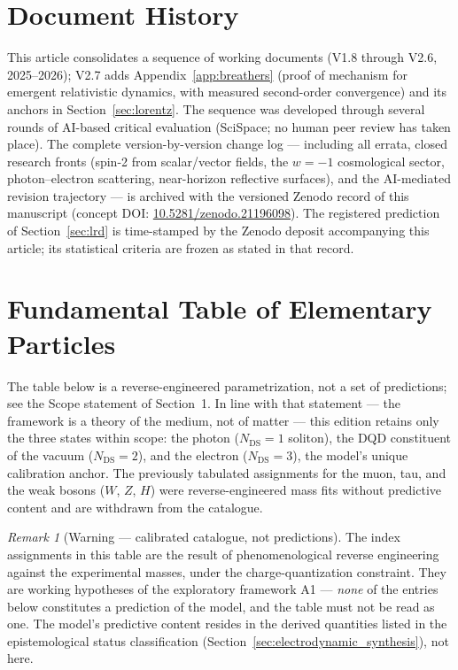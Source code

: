 \documentclass[11pt,a4paper]{article}
\theoremstyle{plain}
\theoremstyle{remark}
\newtheorem*{remarkstar}{Remark}
\newcommand{\Ncd}{\ensuremath{N_{\mathrm{DS}}}}
\begin{document}
\section{Document History}
This article consolidates a sequence of working documents (V1.8 through V2.6, 2025--2026); V2.7 adds Appendix~\ref{app:breathers} (proof of mechanism for emergent relativistic dynamics, with measured second-order convergence) and its anchors in Section~\ref{sec:lorentz}. The sequence was developed through several rounds of AI-based critical evaluation (SciSpace; no human peer review has taken place). The complete version-by-version change log --- including all errata, closed research fronts (spin-2 from scalar/vector fields, the $w=-1$ cosmological sector, photon--electron scattering, near-horizon reflective surfaces), and the AI-mediated revision trajectory --- is archived with the versioned Zenodo record of this manuscript (concept DOI: \href{https://doi.org/10.5281/zenodo.21196098}{10.5281/zenodo.21196098}). The registered prediction of Section~\ref{sec:lrd} is time-stamped by the Zenodo deposit accompanying this article; its statistical criteria are frozen as stated in that record.

\section{Fundamental Table of Elementary Particles}
The table below is a reverse-engineered parametrization, not a set of predictions; see the Scope statement of Section~1. In line with that statement --- the framework is a theory of the medium, not of matter --- this edition retains only the three states within scope: the photon ($\Ncd=1$ soliton), the DQD constituent of the vacuum ($\Ncd=2$), and the electron ($\Ncd=3$), the model's unique calibration anchor. The previously tabulated assignments for the muon, tau, and the weak bosons ($W$, $Z$, $H$) were reverse-engineered mass fits without predictive content and are withdrawn from the catalogue.

\begin{remarkstar}[Warning --- calibrated catalogue, not predictions]
The index assignments in this table are the result of phenomenological reverse engineering against the experimental masses, under the charge-quantization constraint. They are working hypotheses of the exploratory framework A1 --- \emph{none} of the entries below constitutes a prediction of the model, and the table must not be read as one. The model's predictive content resides in the derived quantities listed in the epistemological status classification (Section~\ref{sec:electrodynamic_synthesis}), not here.
\end{remarkstar}
\end{document}
